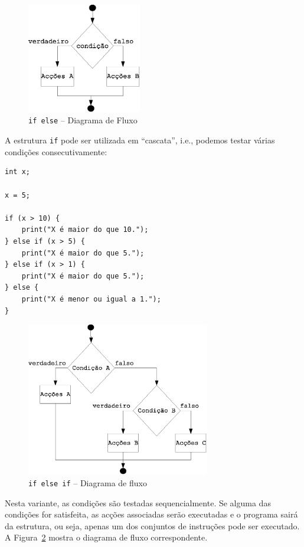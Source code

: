 \begin{figure}[!ht]
	\centering
		\includegraphics[width=5cm]{images/se-entao-senao.eps}
	\caption{\texttt{if else} -- Diagrama de Fluxo}
	\label{fig:se-entao-senao}
\end{figure}

A estrutura \texttt{if} pode ser utilizada em ``cascata'', i.e., podemos testar várias condições consecutivamente:
\begin{lstlisting}
int x;

x = 5;

if (x > 10) {
    print("X é maior do que 10.");
} else if (x > 5) {
    print("X é maior do que 5.");
} else if (x > 1) {
    print("X é maior do que 5.");
} else {
    print("X é menor ou igual a 1.");
}
\end{lstlisting}


\begin{figure}[ht]
	\centering
		\includegraphics[width=8cm]{images/se-entao-senao-se-senao.eps}
	\caption{\texttt{if else if} -- Diagrama de fluxo}
	\label{fig:se-entao-senao-se-senao}
\end{figure}

Nesta variante, as condições são testadas sequencialmente. Se alguma das condições for
satisfeita, as acções associadas serão executadas e o programa sairá da estrutura, ou seja,
apenas um dos conjuntos de instruções pode ser executado. A Figura~\ref{fig:se-entao-senao-se-senao}
mostra o diagrama de fluxo correspondente.

